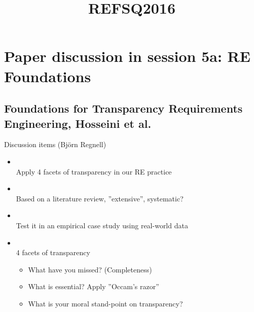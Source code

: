 \documentclass{slides}
\title{REFSQ2016}
\begin{document}
\section{Paper discussion in session 5a: RE Foundations}
\subsection{Foundations for Transparency Requirements Engineering, Hosseini et al.}

\begin{Slide}{Discussion items (Björn Regnell)}
\begin{itemize}
\item  {} \\ \pause
  Apply 4 facets of transparency in our RE practice
\pause\item  {} \\ \pause
  Based on a literature review, ''extensive'', systematic?
\pause\item    {} \\ \pause
        Test it in an empirical case study using real-world data
\pause\item    {} \\ \pause
   4 facets of transparency
\pause
\begin{itemize}
\item What have you missed? (Completeness)
\item What is essential? Apply ''Occam's razor''
\item What is your moral stand-point on transparency?
\end{itemize}
\end{itemize}
\end{Slide}
\end{document}
